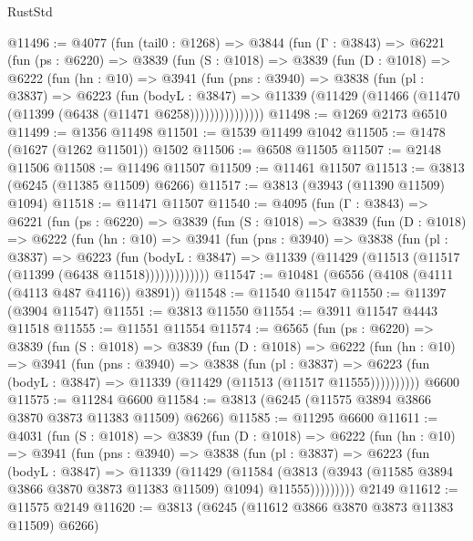 \begin{lexlean}{RustStd}
\begin{coremodule}
@11496 := @4077
    (fun (tail0 : @1268) =>
    @3844
      (fun (Γ : @3843) =>
      @6221
        (fun (ps : @6220) =>
        @3839
          (fun (S : @1018) =>
          @3839
            (fun (D : @1018) =>
            @6222
              (fun (hn : @10) =>
              @3941
                (fun (pns : @3940) =>
                @3838
                  (fun (pl : @3837) =>
                  @6223
                    (fun (bodyL : @3847) =>
                    @11339 (@11429 (@11466 (@11470 (@11399 (@6438 (@11471 @6258)))))))))))))))
@11498 := @1269 @2173 @6510
@11499 := @1356 @11498
@11501 := @1539 @11499 @1042
@11505 := @1478 (@1627 (@1262 @11501)) @1502
@11506 := @6508 @11505
@11507 := @2148 @11506
@11508 := @11496 @11507
@11509 := @11461 @11507
@11513 := @3813 (@6245 (@11385 @11509) @6266)
@11517 := @3813 (@3943 (@11390 @11509) @1094)
@11518 := @11471 @11507
@11540 := @4095
    (fun (Γ : @3843) =>
    @6221
      (fun (ps : @6220) =>
      @3839
        (fun (S : @1018) =>
        @3839
          (fun (D : @1018) =>
          @6222
            (fun (hn : @10) =>
            @3941
              (fun (pns : @3940) =>
              @3838
                (fun (pl : @3837) =>
                @6223
                  (fun (bodyL : @3847) =>
                  @11339 (@11429 (@11513 (@11517 (@11399 (@6438 @11518)))))))))))))
@11547 := @10481 (@6556 (@4108 (@4111 (@4113 @487 @4116)) @3891))
@11548 := @11540 @11547
@11550 := @11397 (@3904 @11547)
@11551 := @3813 @11550
@11554 := @3911 @11547 @4443 @11518
@11555 := @11551 @11554
@11574 := @6565
    (fun (ps : @6220) =>
    @3839
      (fun (S : @1018) =>
      @3839
        (fun (D : @1018) =>
        @6222
          (fun (hn : @10) =>
          @3941
            (fun (pns : @3940) =>
            @3838
              (fun (pl : @3837) =>
              @6223 (fun (bodyL : @3847) => @11339 (@11429 (@11513 (@11517 @11555))))))))))
    @6600
@11575 := @11284 @6600
@11584 := @3813 (@6245 (@11575 @3894 @3866 @3870 @3873 @11383 @11509) @6266)
@11585 := @11295 @6600
@11611 := @4031
    (fun (S : @1018) =>
    @3839
      (fun (D : @1018) =>
      @6222
        (fun (hn : @10) =>
        @3941
          (fun (pns : @3940) =>
          @3838
            (fun (pl : @3837) =>
            @6223
              (fun (bodyL : @3847) =>
              @11339
                (@11429
                  (@11584
                    (@3813
                      (@3943 (@11585 @3894 @3866 @3870 @3873 @11383 @11509) @1094)
                      @11555)))))))))
    @2149
@11612 := @11575 @2149
@11620 := @3813 (@6245 (@11612 @3866 @3870 @3873 @11383 @11509) @6266)

\end{coremodule}
\end{lexlean}
